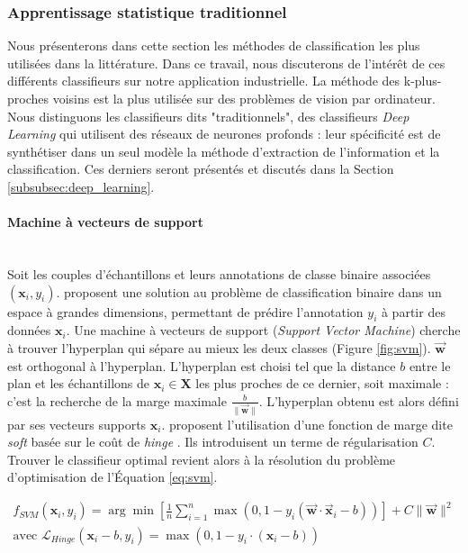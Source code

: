 \subsubsection{Apprentissage statistique traditionnel}
Nous présenterons dans cette section les méthodes de classification les plus utilisées dans la littérature.
Dans ce travail, nous discuterons de l'intérêt de ces différents classifieurs sur notre application industrielle.
La méthode des k-plus-proches voisins est la plus utilisée sur des problèmes de vision par ordinateur.
Nous distinguons les classifieurs dits "traditionnels", des classifieurs \textit{Deep Learning} qui utilisent des réseaux de neurones profonds : leur spécificité est de synthétiser dans un seul modèle la méthode d'extraction de l'information et la classification.
Ces derniers seront présentés et discutés dans la Section \ref{subsubsec:deep_learning}.

\paragraph{Machine à vecteurs de support}\mbox{\label{parag:svm}} \\
Soit les couples d'échantillons et leurs annotations de classe binaire associées $(\mathbf{x}_i, y_i)$.
\citeauthor{vapnik_patterns_1963} \cite{vapnik_patterns_1963} proposent une solution au problème de classification binaire dans un espace à grandes dimensions, permettant de prédire l'annotation $y_i$ à partir des données $\mathbf{x}_i$.
Une machine à vecteurs de support (\textit{Support Vector Machine}) cherche à trouver l'hyperplan qui sépare au mieux les deux classes (Figure \ref{fig:svm}). $\vec{\mathbf{w}}$  est orthogonal à l'hyperplan.
L'hyperplan est choisi tel que la distance $b$ entre le plan et les échantillons de $\mathbf{x}_i \in \mathbf{X}$ les plus proches de ce dernier, soit maximale : c'est la recherche de la marge maximale $\frac{b}{\|\vec{\mathbf{w}}\|}$.
L'hyperplan obtenu est alors défini par ses vecteurs supports $\mathbf{x}_i$.
\citeauthor{cortes_supportvector_1995} proposent l'utilisation d'une fonction de marge dite \textit{soft} basée sur le coût de \textit{hinge} \cite{cortes_supportvector_1995, vapnik_support_1997}.
Ils introduisent un terme de régularisation $C$. Trouver le classifieur optimal revient alors à la résolution du problème d'optimisation de l'Équation \ref{eq:svm}.

\begin{equation} \label{eq:svm}
\begin{split}
f_{SVM}(\mathbf{x}_i, y_i) = \arg \min \left[\frac{1}{n} \sum_{i=1}^{n} \max \left(0, 1-y_{i}\left(\vec{\mathbf{w}} \cdot \vec{\mathbf{x}}_{i}-b\right)\right)\right]+ C \|\vec{\mathbf{w}}\|^{2}
\\
\text{avec } \mathcal{L}_{Hinge}(\mathbf{x}_i-b, y_i) = \max (0, 1 - y_i \cdot (\mathbf{x}_i-b))
\end{split}
\end{equation}

